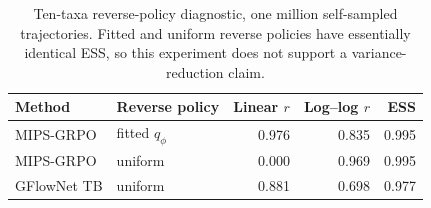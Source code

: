 \begin{table}[htbp]
\centering
\caption{Ten-taxa reverse-policy diagnostic, one million self-sampled
trajectories. Fitted and uniform reverse policies have essentially identical
ESS, so this experiment does not support a variance-reduction claim.}
\begin{tabular}{llrrr}
\toprule
Method & Reverse policy & Linear \(r\) & Log--log \(r\) & ESS \\
\midrule
MIPS-GRPO & fitted \(q_\phi\) & 0.976 & 0.835 & 0.995 \\
MIPS-GRPO & uniform & 0.000 & 0.969 & 0.995 \\
GFlowNet TB & uniform & 0.881 & 0.698 & 0.977 \\
\bottomrule
\end{tabular}
\end{table}

